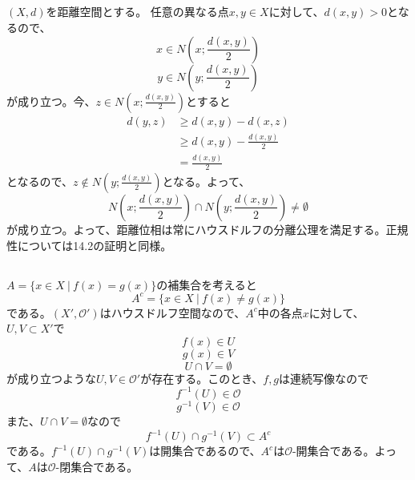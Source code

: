 \documentclass{jsarticle}
\begin{document}
\subsection{}
$(X,d)$を距離空間とする。
任意の異なる点$x,y\in X$に対して、$d(x,y)>0$となるので、
\[x\in N(x;\frac{d(x,y)}{2})\]
\[y\in N(y;\frac{d(x,y)}{2})\]
が成り立つ。今、$z\in N(x;\frac{d(x,y)}{2})$とすると
\begin{align*}
d(y,z)&\geq d(x,y)-d(x,z)\\
&\geq d(x,y)-\frac{d(x,y)}{2}\\
&=\frac{d(x,y)}{2}
\end{align*}
となるので、$z\notin N(y;\frac{d(x,y)}{2})$となる。よって、
\[N(x;\frac{d(x,y)}{2})\cap N(y;\frac{d(x,y)}{2})\neq\emptyset\]
が成り立つ。よって、距離位相は常にハウスドルフの分離公理を満足する。正規性については14.2の証明と同様。


\subsection{}
$A=\{x\in X\ |\ f(x)=g(x)\}$の補集合を考えると
\[A^c=\{x\in X\ |\ f(x)\neq g(x)\}\]
である。$(X',\mathcal{O}')$はハウスドルフ空間なので、$A^c$中の各点$x$に対して、$U,V\subset X'$で
\[f(x)\in U\]
\[g(x)\in V\]
\[U\cap V=\emptyset\]
が成り立つような$U,V\in\mathcal{O}'$が存在する。このとき、$f,g$は連続写像なので
\[f^{-1}(U)\in\mathcal{O}\]
\[g^{-1}(V)\in\mathcal{O}\]
また、$U\cap V=\emptyset$なので
\[f^{-1}(U)\cap g^{-1}(V)\subset A^{c}\]
である。$f^{-1}(U)\cap g^{-1}(V)$は開集合であるので、$A^c$は$\mathcal{O}$-開集合である。よって、$A$は$\mathcal{O}$-閉集合である。


\end{document}
